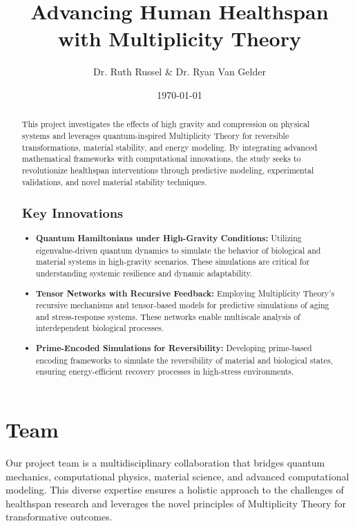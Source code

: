 \documentclass{article}
\theoremstyle{plain}
\begin{document}
\title{Advancing Human Healthspan\\ with Multiplicity Theory}

\author{Dr. Ruth Russel \& Dr. Ryan Van Gelder}
\date{\today}
\maketitle
\begin{abstract}
This project investigates the effects of high gravity and compression on physical systems and leverages quantum-inspired Multiplicity Theory for reversible transformations, material stability, and energy modeling. By integrating advanced mathematical frameworks with computational innovations, the study seeks to revolutionize healthspan interventions through predictive modeling, experimental validations, and novel material stability techniques.

\subsection*{Key Innovations}
\begin{itemize}
    \item \textbf{Quantum Hamiltonians under High-Gravity Conditions:} Utilizing eigenvalue-driven quantum dynamics to simulate the behavior of biological and material systems in high-gravity scenarios. These simulations are critical for understanding systemic resilience and dynamic adaptability.
    \item \textbf{Tensor Networks with Recursive Feedback:} Employing Multiplicity Theory's recursive mechanisms and tensor-based models for predictive simulations of aging and stress-response systems. These networks enable multiscale analysis of interdependent biological processes.
    \item \textbf{Prime-Encoded Simulations for Reversibility:} Developing prime-based encoding frameworks to simulate the reversibility of material and biological states, ensuring energy-efficient recovery processes in high-stress environments.
\end{itemize}
\end{abstract}

\section{Team}
Our project team is a multidisciplinary collaboration that bridges quantum mechanics, computational physics, material science, and advanced computational modeling. This diverse expertise ensures a holistic approach to the challenges of healthspan research and leverages the novel principles of Multiplicity Theory for transformative outcomes.
\end{document}
